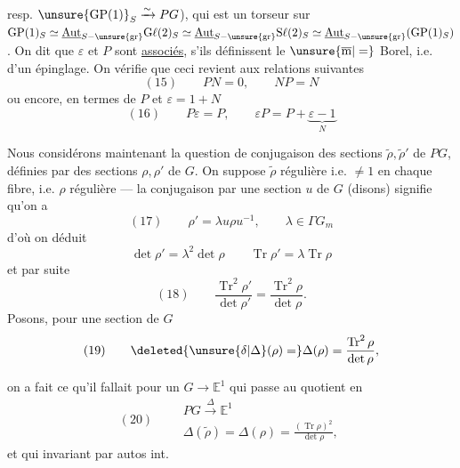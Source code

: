 

resp. $\unsure{\mathrm{GP}(1)}_S\xrightarrow{\sim}PG$),
qui est un torseur sur
$\mathrm{GP}(1)_S\simeq
\underline{\mathrm{Aut}}_{S-\unsure{\mathrm{gr}}}\mathrm{G}\ell(2)_S
\simeq\underline{\mathrm{Aut}}_{S-\unsure{\mathrm{gr}}}\mathrm{S}\ell(2)_S
\simeq\underline{\mathrm{Aut}}_{S-\unsure{\mathrm{gr}}}
(\mathrm{GP}(1)_S)$.
On dit que $\varepsilon$ et $P$ sont
\uline{associés},
s'ils définissent le $\unsure{\overline{\mathrm m}|=}$ Borel,
i.e. 
 d'un épinglage.
On vérifie que ceci revient aux relations suivantes
\[
(15)\qquad PN=0,\qquad NP=N
\]
 ou encore, en termes de $P$ et $\varepsilon=1+N$
\[
(16)\qquad P\varepsilon=P,\qquad
\varepsilon P=P+\underbrace{\varepsilon-1}_{N}
\]

Nous considérons maintenant la question de
 conjugaison des sections
$\widetilde\rho,\widetilde\rho'$ de $PG$,
définies par des sections $\rho,\rho'$ de $G$.
On suppose $\widetilde\rho$ régulière i.e. $\ne1$ en
chaque  fibre, i.e. $\rho$ régulière —
 la conjugaison
par une section $u$ de $G$ (disons) signifie qu'on a
\[
(17)\qquad \rho'=\lambda u\rho u^{-1},\qquad
\lambda\in\Gamma G_m
\]
d'où on déduit
\[
\det\rho'=\lambda^2\det\rho\qquad
\operatorname{Tr}\rho'=\lambda\operatorname{Tr}\rho
\]
et par suite
\[
(18)\qquad
\frac{\operatorname{Tr}^2\rho'}{\det\rho'}
=\frac{\operatorname{Tr}^2\rho}{\det\rho}.
\]
Posons, pour une section de $G$
\[
(19)\qquad
\deleted{\unsure{\delta|\Delta}(\rho)=}
\Delta(\rho)=\frac{\operatorname{Tr}^2\rho}{\det\rho},
\]



on a fait ce qu'il fallait pour 
 un $G\longrightarrow \mathbb E^1$ qui passe au
quotient en
\[
(20)\qquad
\begin{gathered}
PG\xrightarrow{\Delta}\mathbb E^1\\
\Delta(\widetilde\rho)=\Delta(\rho)
=\frac{(\operatorname{Tr}\rho)^2}{\det\rho},
\end{gathered}
\]
et qui  invariant par autos int.

